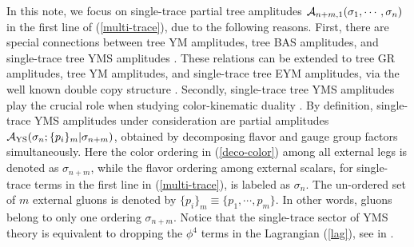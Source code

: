 \documentclass[preprint,showpacs,onecolumn,nofootinbib]{revtex4}
\def\eref#1{(\ref{#1})}
\begin{document}
In this note, we focus on single-trace partial tree amplitudes ${\cal A}_{n+m,1}(\sigma_1,\cdots,\sigma_n)$ in the first line of \eref{multi-trace}, due to the following reasons. First, there are special connections between tree YM amplitudes, tree BAS amplitudes, and single-trace tree YMS amplitudes \cite{Cachazo:2013iea,Cachazo:2014xea}. These relations can be extended to tree GR amplitudes, tree YM amplitudes, and single-trace tree EYM amplitudes, via the well known double copy structure \cite{Cachazo:2013iea,Cachazo:2014nsa,Cachazo:2014xea,Zhou:2018wvn,Bollmann:2018edb}.
Secondly, single-trace tree YMS amplitudes play the crucial role  when studying color-kinematic duality \cite{Cachazo:2013iea,Cachazo:2014nsa,Cachazo:2014xea,Cheung:2021zvb,Chiodaroli:2014xia,Chiodaroli:2017ngp}. By definition, single-trace YMS amplitudes under consideration are partial amplitudes ${\cal A}_{\rm YS}(\sigma_n;\{p_i\}_m|\sigma_{n+m})$, obtained by decomposing flavor and gauge group factors simultaneously. Here the color ordering in \eref{deco-color} among all external legs is denoted as $\sigma_{n+m}$, while the flavor ordering among external scalars, for single-trace terms in the first line in \eref{multi-trace}, is labeled as $\sigma_n$. The un-ordered set of $m$ external gluons is denoted by $\{p_i\}_m\equiv\{p_1,\cdots,p_m\}$. In other words, gluons belong to only one ordering $\sigma_{n+m}$.
Notice that the single-trace sector of YMS theory is equivalent to dropping the $\phi^4$ terms in the Lagrangian \eref{lag}, see in \cite{Cheung:2021zvb,Chiodaroli:2014xia,Chiodaroli:2017ngp}.
\end{document}

